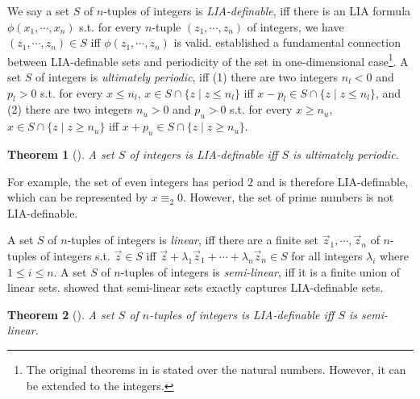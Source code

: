 \documentclass[review]{elsarticle}
\newcommand{\set}[1]{\{ #1 \}}
\newcommand{\modulo}{\equiv}
\newtheorem{theorem}{Theorem}
\begin{document}
	We say a set $S$ of $n$-tuples of integers is \textit{LIA-definable}, iff there is an LIA formula $\phi(x_1, \cdots, x_n)$ s.t. for every $n$-tuple $(z_1, \cdots, z_n)$ of integers, we have $(z_1, \cdots, z_n) \in S$ iff $\phi(z_1, \cdots, z_n)$ is valid.
	\citet{Pre1929} established a fundamental connection between LIA-definable sets and periodicity of the set in one-dimensional case\footnote{The original theorems in \cite{Pre1929,GinS1966} is stated over the natural numbers. However, it can be extended to the integers.}.	
	A set $S$ of integers is \textit{ultimately periodic}, iff (1) there are two integers $n_l < 0$ and $p_l > 0$ s.t. for every $x \leq n_l$, $x \in S \cap \set{z \mid z \leq n_l}$ iff $x - p_l \in S \cap \set{z \mid z \leq n_l}$, and (2) there are two integers $n_u > 0$ and $p_u > 0$ s.t. for every $x \geq n_u$, $x \in S \cap \set{z \mid z \geq n_u}$ iff $x + p_u \in S \cap \set{z \mid z \geq n_u}$.
	\begin{theorem}[\cite{Pre1929}] \label{thm:ultPeriodic}
		A set $S$ of integers is LIA-definable iff $S$ is ultimately periodic.
	\end{theorem}
	
	For example, the set of even integers has period $2$ and is therefore LIA-definable, which can be represented by $x \modulo_{2} 0$.
	However, the set of prime numbers is not LIA-definable. 
		
	A set $S$ of $n$-tuples of integers is \textit{linear}, iff there are a finite set $\vec{z}_1, \cdots, \vec{z}_n$ of $n$-tuples of integers s.t. $\vec{z} \in S$ iff $\vec{z} + \lambda_1 \vec{z}_1 + \cdots + \lambda_n \vec{z}_n \in S$ for all integers $\lambda_i$ where $1 \leq i \leq n$.
	A set $S$ of $n$-tuples of integers is \textit{semi-linear}, iff it is a finite union of linear sets.
	\citet{GinS1966} showed that semi-linear sets exactly captures LIA-definable sets.	
	
	\begin{theorem}[\cite{GinS1966}] \label{thm:semiLin}
		A set $S$ of $n$-tuples of integers is LIA-definable iff $S$ is semi-linear.
	\end{theorem}	
	
\end{document}

